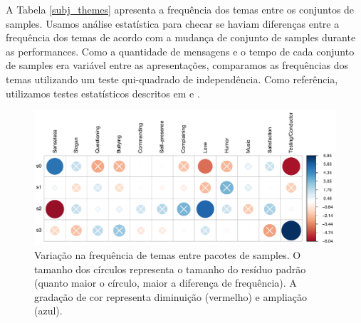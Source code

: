 A Tabela \ref{subj_themes} apresenta a frequência dos temas entre os conjuntos de samples. Usamos análise estatística para checar se haviam diferenças entre a frequência dos temas de acordo com a mudança de conjunto de samples durante as performances. Como a quantidade de mensagens e o tempo de cada conjunto de samples era variável entre as apresentações, comparamos as frequências dos temas utilizando um teste qui-quadrado de independência. Como referência, utilizamos testes estatísticos descritos em \cite{beasley1995multiple} e \cite{garcia2003cellwise}. 


\begin{figure}
\centering
\includegraphics[width=1\linewidth]{pictures/cap3/p_values}
\caption{Variação na frequência de temas entre pacotes de samples. O tamanho dos círculos representa o tamanho do resíduo padrão (quanto maior o círculo, maior a diferença de frequência). A gradação de cor representa diminuição (vermelho) e ampliação (azul).}
\label{fig:bblplot2}
\end{figure}

